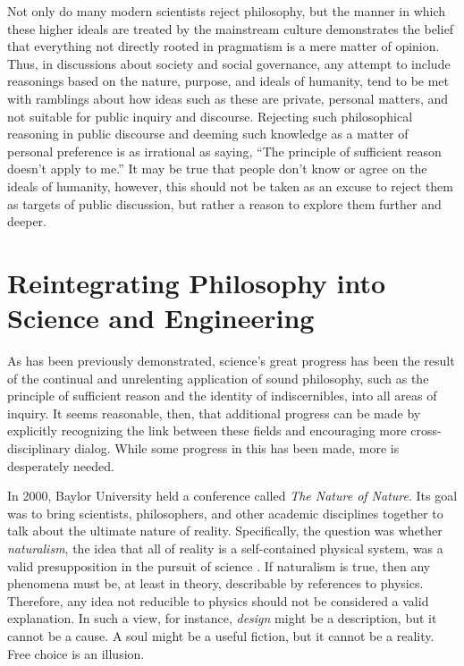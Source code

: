 Not only do many modern scientists reject philosophy, but the manner in which these higher ideals are treated by the mainstream culture demonstrates the belief that everything not directly rooted in pragmatism is a mere matter of opinion.  
Thus, in discussions about society and social governance, any attempt to include reasonings based on the nature, purpose, and ideals of humanity, tend to be met with ramblings about how ideas such as these are private, personal matters, and not suitable for public inquiry and discourse.  Rejecting such philosophical reasoning in public discourse and deeming such knowledge as a matter of personal preference is as irrational as saying, ``The principle of sufficient reason doesn't apply to me.''  It may be true that people don't know or agree on the ideals of humanity, however, this should not be taken as an excuse to reject them as targets of public discussion, but rather a reason to explore them further and deeper.

\section{Reintegrating Philosophy into Science and Engineering}

As has been previously demonstrated, science's great progress has been the result of the continual and unrelenting application of sound philosophy, such as the principle of sufficient reason and the identity of indiscernibles, into all areas of inquiry.  It seems reasonable, then, that additional progress can be made by explicitly recognizing the link between these fields and encouraging more cross-disciplinary dialog.  While some progress in this has been made, more is desperately needed.

In 2000, Baylor University held a conference called \textit{The Nature of Nature}.  Its goal was to bring scientists, philosophers, and other academic disciplines together to talk about the ultimate nature of reality.  Specifically, the question was whether \textit{naturalism}, the idea that all of reality is a self-contained physical system, was a valid presupposition in the pursuit of science \citep{gordondembski2011}.
If naturalism is true, then any phenomena must be, at least in theory, describable by references to physics.  Therefore, any idea not reducible to physics should not be considered a valid explanation.  In such a view, for instance, \textit{design} might be a description, but it cannot be a cause.  A soul might be a useful fiction, but it cannot be a reality.  Free choice is an illusion.  

